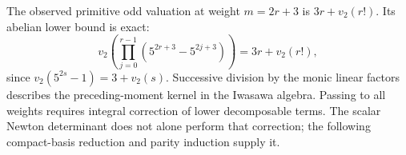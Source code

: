 The observed primitive odd valuation at weight $m=2r+3$ is
$3r+v_2(r!)$. Its abelian lower bound is exact:
\[
 v_2\!\left(\prod_{j=0}^{r-1}
 (5^{2r+3}-5^{2j+3})\right)=3r+v_2(r!),
\]
since $v_2(5^{2s}-1)=3+v_2(s)$. Successive division by the
monic linear factors describes the preceding-moment kernel
in the Iwasawa algebra. Passing to all weights requires integral
correction of lower decomposable terms. The scalar Newton determinant
does not alone perform that correction; the following compact-basis
reduction and parity induction supply it.
